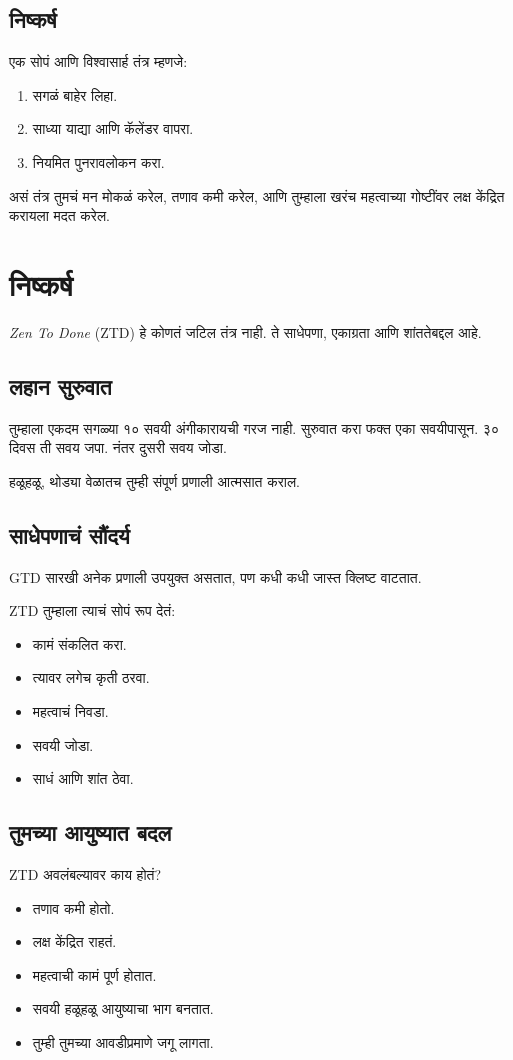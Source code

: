 \section*{निष्कर्ष}
एक सोपं आणि विश्वासार्ह तंत्र म्हणजे:  
\begin{enumerate}
\item सगळं बाहेर लिहा.  
\item साध्या याद्या आणि कॅलेंडर वापरा.  
\item नियमित पुनरावलोकन करा.  
\end{enumerate}

असं तंत्र तुमचं मन मोकळं करेल,  
तणाव कमी करेल,  
आणि तुम्हाला खरंच महत्वाच्या गोष्टींवर लक्ष केंद्रित करायला मदत करेल.  


\chapter*{निष्कर्ष}


\textit{Zen To Done} (ZTD) हे कोणतं जटिल तंत्र नाही.  
ते साधेपणा, एकाग्रता आणि शांततेबद्दल आहे.  

\section*{लहान सुरुवात}
तुम्हाला एकदम सगळ्या १० सवयी अंगीकारायची गरज नाही.  
सुरुवात करा फक्त एका सवयीपासून.  
३० दिवस ती सवय जपा.  
नंतर दुसरी सवय जोडा.  

हळूहळू, थोड्या वेळातच  
तुम्ही संपूर्ण प्रणाली आत्मसात कराल.  

\section*{साधेपणाचं सौंदर्य}
GTD सारखी अनेक प्रणाली उपयुक्त असतात,  
पण कधी कधी जास्त क्लिष्ट वाटतात.  

ZTD तुम्हाला त्याचं सोपं रूप देतं:  
\begin{itemize}
\item कामं संकलित करा.  
\item त्यावर लगेच कृती ठरवा.  
\item महत्वाचं निवडा.  
\item सवयी जोडा.  
\item साधं आणि शांत ठेवा.  
\end{itemize}

\section*{तुमच्या आयुष्यात बदल}
ZTD अवलंबल्यावर काय होतं?  
\begin{itemize}
\item तणाव कमी होतो.  
\item लक्ष केंद्रित राहतं.  
\item महत्वाची कामं पूर्ण होतात.  
\item सवयी हळूहळू आयुष्याचा भाग बनतात.  
\item तुम्ही तुमच्या आवडीप्रमाणे जगू लागता.  
\end{itemize}

